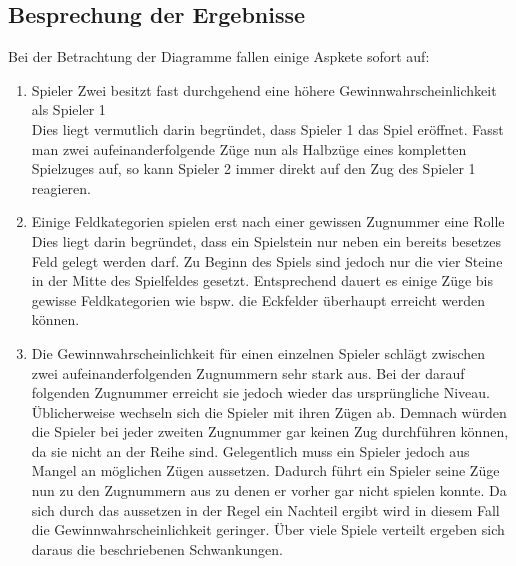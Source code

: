 \subsection{Besprechung der Ergebnisse}
Bei der Betrachtung der Diagramme fallen einige Aspkete sofort auf:
\begin{enumerate}
\item Spieler Zwei besitzt fast durchgehend eine höhere Gewinnwahrscheinlichkeit als Spieler 1
\\Dies liegt vermutlich darin begründet, dass Spieler 1 das Spiel eröffnet. Fasst man zwei aufeinanderfolgende Züge nun als Halbzüge eines kompletten Spielzuges auf, so kann Spieler 2 immer direkt auf den Zug des Spieler 1 reagieren.
\item Einige Feldkategorien spielen erst nach einer gewissen Zugnummer eine Rolle
\\Dies liegt darin begründet, dass ein Spielstein nur neben ein bereits besetzes Feld gelegt werden darf. Zu Beginn des Spiels sind jedoch nur die vier Steine in der Mitte des Spielfeldes gesetzt. Entsprechend dauert es einige Züge bis gewisse Feldkategorien wie bspw. die Eckfelder überhaupt erreicht werden können.
\item Die Gewinnwahrscheinlichkeit für einen einzelnen Spieler schlägt zwischen zwei aufeinanderfolgenden Zugnummern sehr stark aus. Bei der darauf folgenden Zugnummer erreicht sie jedoch wieder das ursprüngliche Niveau.
\\Üblicherweise wechseln sich die Spieler mit ihren Zügen ab. Demnach würden die Spieler bei jeder zweiten Zugnummer gar keinen Zug durchführen können, da sie nicht an der Reihe sind. Gelegentlich muss ein Spieler jedoch aus Mangel an möglichen Zügen aussetzen. Dadurch führt ein Spieler seine Züge nun zu den Zugnummern aus zu denen er vorher gar nicht spielen konnte. Da sich durch das aussetzen in der Regel ein Nachteil ergibt wird in diesem Fall die Gewinnwahrscheinlichkeit geringer. Über viele Spiele verteilt ergeben sich daraus die beschriebenen Schwankungen.
\end{enumerate}
